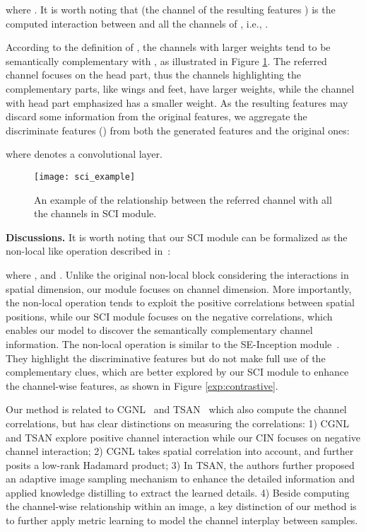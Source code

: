 \documentclass[letterpaper]{article} \usepackage{aaai20}  \usepackage{times}  \usepackage{helvet} \usepackage{courier}  \usepackage[hyphens]{url}  \usepackage{graphicx} \urlstyle{rm} \def\UrlFont{\rm}  \usepackage{graphicx}  \frenchspacing  \setlength{\pdfpagewidth}{8.5in}  \setlength{\pdfpageheight}{11in}  \usepackage{amsmath,amssymb}
\begin{document}
where .
It is worth noting that  (the  channel of the resulting features ) is the computed interaction between  and all the channels of , i.e., .

According to the definition of , the channels with larger weights tend to be semantically complementary with , as illustrated in Figure \ref{approach:sci}. The referred channel  focuses on the head part, thus the channels highlighting the complementary parts, like wings and feet, have larger weights, while the channel with head part emphasized has a smaller weight. As the resulting features  may discard some information from the original features, we aggregate the  discriminate features () from both the generated features and the original ones:

where  denotes a  convolutional layer.

\begin{figure}[t]
\begin{center}
\texttt{[image: sci\_example]}
\end{center}
\caption{An example of the relationship between the referred channel with all the channels in SCI module.}
\label{approach:sci}
\end{figure}



\textbf{Discussions.} It is worth noting that our SCI module can be formalized as the non-local like operation described in~\cite{DBLP:journals/corr/abs-1711-07971}:

where , and . Unlike the original non-local block considering the interactions in spatial dimension, our module focuses on channel dimension.
More importantly, the non-local operation tends to exploit the positive correlations between spatial positions, while our SCI module focuses on the negative correlations, which enables our model to discover the semantically complementary channel information.
The non-local operation is similar to the SE-Inception module~\cite{DBLP:journals/corr/abs-1709-01507}. They highlight the discriminative features but do not make full use of the complementary clues, which are better explored by our SCI module to enhance the channel-wise features, as shown in Figure \ref{exp:contrastive}.

Our method is related to CGNL~\cite{yue2018compact} and TSAN~\cite{DBLP:conf/cvpr/ZhengFZL19} which also compute the channel correlations, but has clear
distinctions on measuring the correlations:
1) CGNL and TSAN explore positive channel interaction while our CIN focuses on negative channel interaction;
2) CGNL takes spatial correlation into account, and further posits a low-rank Hadamard product;
3) In TSAN, the authors further proposed an adaptive image sampling mechanism to enhance the detailed information
and applied knowledge distilling to extract the learned details.
4) Beside computing the channel-wise relationship within an image, a key distinction of our method is to  further apply metric learning to model the channel interplay between samples.
\end{document}
